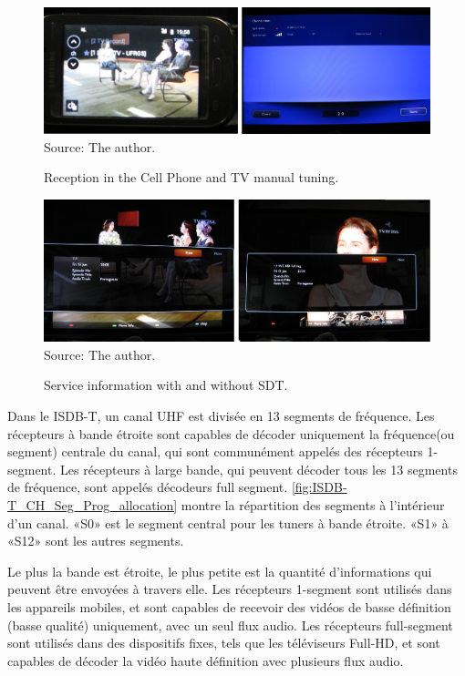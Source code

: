 \documentclass[12pt,a4paper]{article}
\begin{document}
\begin{figure}[!h]
\centering
\includegraphics[width=0.9\linewidth]{pictures/cell_with_sdt.jpg}
\\Source: The author.
\caption{Reception in the Cell Phone and TV manual tuning.}
\label{fig:cell_with_sdt}
\end{figure}

\begin{figure}[!h]
\centering
\includegraphics[width=0.9\linewidth]{pictures/info_with_without_sdt.jpg}
\\Source: The author.
\caption{Service information with and without SDT.}
\label{fig:info_with_without_sdt}
\end{figure}

\newpage
{}
\label{modulation}

Dans le ISDB-T, un canal UHF est divisée en 13 segments de fréquence. Les récepteurs à bande étroite sont capables de décoder uniquement la fréquence(ou segment)  centrale du canal, qui sont communément appelés des récepteurs 1-segment. Les récepteurs à large bande, qui peuvent décoder tous les 13 segments de fréquence, sont appelés décodeurs full segment. \autoref{fig:ISDB-T_CH_Seg_Prog_allocation} montre la répartition des segments à l'intérieur d'un canal. «S0» est le segment central pour les tuners à bande étroite. «S1» à «S12» sont les autres segments.

Le plus la bande est étroite, le plus petite est la quantité d'informations qui peuvent être envoyées à travers elle. Les récepteurs 1-segment sont utilisés dans les appareils mobiles, et sont capables de recevoir des vidéos de basse définition (basse qualité) uniquement, avec un seul flux audio. Les récepteurs full-segment sont utilisés dans des dispositifs fixes, tels que les téléviseurs Full-HD, et sont capables de décoder la vidéo haute définition avec plusieurs flux audio.
\end{document}
